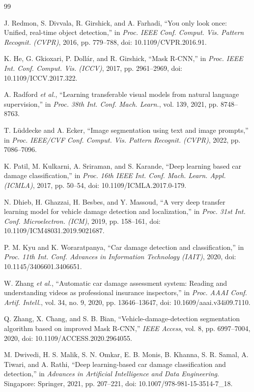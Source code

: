 \documentclass[conference]{IEEEtran}
\begin{document}
\begin{thebibliography}{99}

J. Redmon, S. Divvala, R. Girshick, and A. Farhadi, ``You only look once: Unified, real-time object detection,'' in \emph{Proc. IEEE Conf. Comput. Vis. Pattern Recognit. (CVPR)}, 2016, pp. 779--788, doi: 10.1109/CVPR.2016.91.

K. He, G. Gkioxari, P. Doll\'ar, and R. Girshick, ``Mask R-CNN,'' in \emph{Proc. IEEE Int. Conf. Comput. Vis. (ICCV)}, 2017, pp. 2961--2969, doi: 10.1109/ICCV.2017.322.

A. Radford \emph{et al.}, ``Learning transferable visual models from natural language supervision,'' in \emph{Proc. 38th Int. Conf. Mach. Learn.}, vol. 139, 2021, pp. 8748--8763.

T. L\"uddecke and A. Ecker, ``Image segmentation using text and image prompts,'' in \emph{Proc. IEEE/CVF Conf. Comput. Vis. Pattern Recognit. (CVPR)}, 2022, pp. 7086--7096.

K. Patil, M. Kulkarni, A. Sriraman, and S. Karande, ``Deep learning based car damage classification,'' in \emph{Proc. 16th IEEE Int. Conf. Mach. Learn. Appl. (ICMLA)}, 2017, pp. 50--54, doi: 10.1109/ICMLA.2017.0-179.

N. Dhieb, H. Ghazzai, H. Besbes, and Y. Massoud, ``A very deep transfer learning model for vehicle damage detection and localization,'' in \emph{Proc. 31st Int. Conf. Microelectron. (ICM)}, 2019, pp. 158--161, doi: 10.1109/ICM48031.2019.9021687.

P. M. Kyu and K. Woraratpanya, ``Car damage detection and classification,'' in \emph{Proc. 11th Int. Conf. Advances in Information Technology (IAIT)}, 2020, doi: 10.1145/3406601.3406651.

W. Zhang \emph{et al.}, ``Automatic car damage assessment system: Reading and understanding videos as professional insurance inspectors,'' in \emph{Proc. AAAI Conf. Artif. Intell.}, vol. 34, no. 9, 2020, pp. 13646--13647, doi: 10.1609/aaai.v34i09.7110.

Q. Zhang, X. Chang, and S. B. Bian, ``Vehicle-damage-detection segmentation algorithm based on improved Mask R-CNN,'' \emph{IEEE Access}, vol. 8, pp. 6997--7004, 2020, doi: 10.1109/ACCESS.2020.2964055.

M. Dwivedi, H. S. Malik, S. N. Omkar, E. B. Monis, B. Khanna, S. R. Samal, A. Tiwari, and A. Rathi, ``Deep learning-based car damage classification and detection,'' in \emph{Advances in Artificial Intelligence and Data Engineering}. Singapore: Springer, 2021, pp. 207--221, doi: 10.1007/978-981-15-3514-7\_18.


\end{thebibliography}
\end{document}
